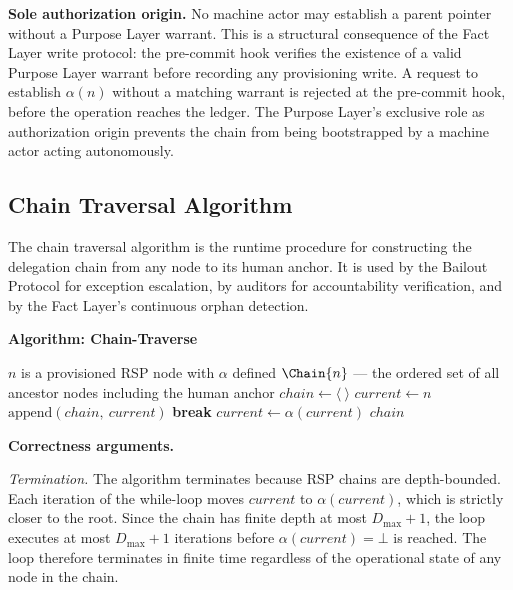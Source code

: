 \medskip
\noindent\textbf{Sole authorization origin.} No machine actor may establish a parent pointer without a Purpose Layer warrant. This is a structural consequence of the Fact Layer write protocol: the pre-commit hook verifies the existence of a valid Purpose Layer warrant before recording any provisioning write. A request to establish $\alpha(n)$ without a matching warrant is rejected at the pre-commit hook, before the operation reaches the ledger. The Purpose Layer's exclusive role as authorization origin prevents the chain from being bootstrapped by a machine actor acting autonomously.

\subsection{Chain Traversal Algorithm}
\label{sec:chain-traversal}

The chain traversal algorithm is the runtime procedure for constructing the delegation chain from any node to its human anchor. It is used by the Bailout Protocol for exception escalation, by auditors for accountability verification, and by the Fact Layer's continuous orphan detection.

\medskip
\noindent\textbf{Algorithm: Chain-Traverse}

\begin{algorithm}
\caption{Chain-Traverse($n$) --- Build the delegation chain from node $n$ to the human anchor}
\label{alg:chain-traverse}
\begin{algorithmic}[1]
\REQUIRE $n$ is a provisioned RSP node with $\alpha$ defined
\ENSURE $\Chain{n}$ --- the ordered set of all ancestor nodes including the human anchor
\STATE $chain \leftarrow \langle\ \rangle$ 
\STATE $current \leftarrow n$ 
    \STATE $\text{append}(chain,\ current)$ 
        \STATE \textbf{break} 
    \ENDIF
    \STATE $current \leftarrow \alpha(current)$ 
\ENDWHILE
\RETURN $chain$
\end{algorithmic}
\end{algorithm}

\medskip
\noindent\textbf{Correctness arguments.}

\textit{Termination.} The algorithm terminates because RSP chains are depth-bounded. Each iteration of the while-loop moves $current$ to $\alpha(current)$, which is strictly closer to the root. Since the chain has finite depth at most $D_{\max} + 1$, the loop executes at most $D_{\max} + 1$ iterations before $\alpha(current) = \bot$ is reached. The loop therefore terminates in finite time regardless of the operational state of any node in the chain.

